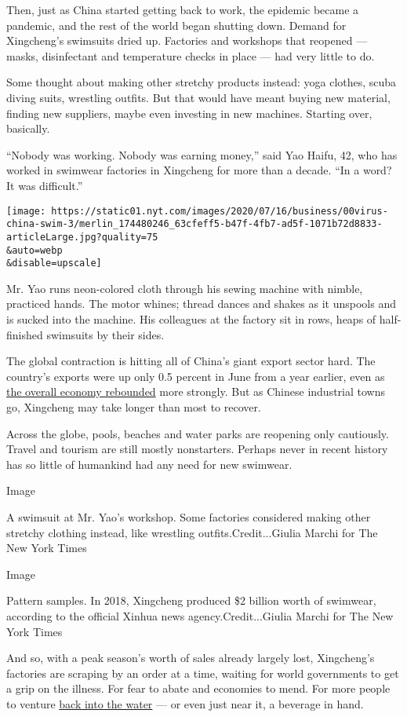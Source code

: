 Then, just as China started getting back to work, the epidemic became a
pandemic, and the rest of the world began shutting down. Demand for
Xingcheng's swimsuits dried up. Factories and workshops that reopened
--- masks, disinfectant and temperature checks in place --- had very
little to do.

Some thought about making other stretchy products instead: yoga clothes,
scuba diving suits, wrestling outfits. But that would have meant buying
new material, finding new suppliers, maybe even investing in new
machines. Starting over, basically.

``Nobody was working. Nobody was earning money,'' said Yao Haifu, 42,
who has worked in swimwear factories in Xingcheng for more than a
decade. ``In a word? It was difficult.''

\texttt{[image: https://static01.nyt.com/images/2020/07/16/business/00virus-china-swim-3/merlin\_174480246\_63cfeff5-b47f-4fb7-ad5f-1071b72d8833-articleLarge.jpg?quality=75\\\&auto=webp\\\&disable=upscale]}

Mr. Yao runs neon-colored cloth through his sewing machine with nimble,
practiced hands. The motor whines; thread dances and shakes as it
unspools and is sucked into the machine. His colleagues at the factory
sit in rows, heaps of half-finished swimsuits by their sides.

The global contraction is hitting all of China's giant export sector
hard. The country's exports were up only 0.5 percent in June from a year
earlier, even as
\href{https://www.nytimes.com/2020/07/15/business/economy/china-coronavirus-economy.html}{the
overall economy rebounded} more strongly. But as Chinese industrial
towns go, Xingcheng may take longer than most to recover.

Across the globe, pools, beaches and water parks are reopening only
cautiously. Travel and tourism are still mostly nonstarters. Perhaps
never in recent history has so little of humankind had any need for new
swimwear.

Image

A swimsuit at Mr. Yao's workshop. Some factories considered making other
stretchy clothing instead, like wrestling outfits.Credit...Giulia Marchi
for The New York Times

Image

Pattern samples. In 2018, Xingcheng produced \$2 billion worth of
swimwear, according to the official Xinhua news agency.Credit...Giulia
Marchi for The New York Times

And so, with a peak season's worth of sales already largely lost,
Xingcheng's factories are scraping by an order at a time, waiting for
world governments to get a grip on the illness. For fear to abate and
economies to mend. For more people to venture
\href{https://www.nytimes.com/2020/05/27/world/europe/italy-beaches-coronavirus-reopening.html}{back
into the water} --- or even just near it, a beverage in hand.

